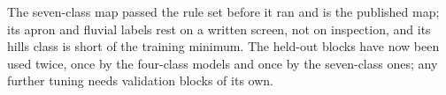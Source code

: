
The seven-class map passed the rule set before it ran and is the published map; its apron and fluvial labels rest on
a written screen, not on inspection, and its hills class is short of the training minimum.
The held-out blocks have now been used twice, once by the four-class models and once by the seven-class ones; any
further tuning needs validation blocks of its own.


